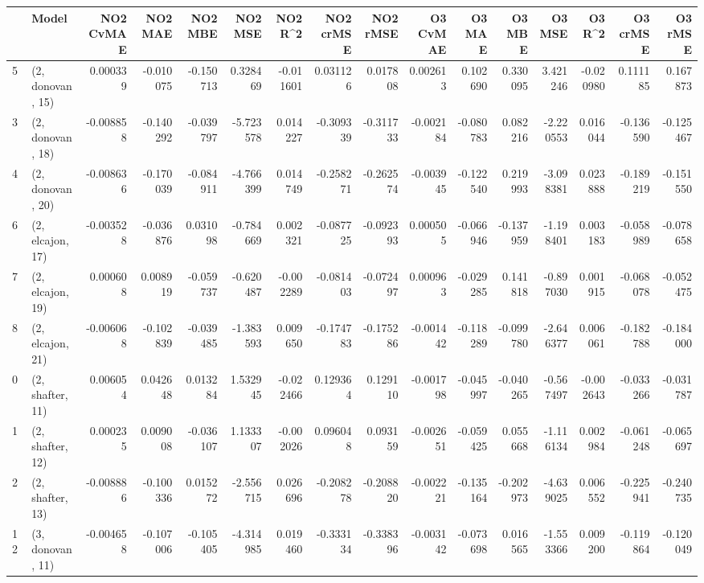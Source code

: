 \begin{tabular}{llrrrrrrrrrrrrrr}
\toprule
{} &             Model &  NO2 CvMAE &   NO2 MAE &   NO2 MBE &    NO2 MSE &   NO2 R\textasciicircum2 &  NO2 crMSE &  NO2 rMSE &  O3 CvMAE &    O3 MAE &    O3 MBE &     O3 MSE &    O3 R\textasciicircum2 &  O3 crMSE &   O3 rMSE \\
\midrule
5  &  (2, donovan, 15) &   0.000339 & -0.010075 & -0.150713 &   0.328469 & -0.011601 &   0.031126 &  0.017808 &  0.002613 &  0.102690 &  0.330095 &   3.421246 & -0.020980 &  0.111185 &  0.167873 \\
3  &  (2, donovan, 18) &  -0.008858 & -0.140292 & -0.039797 &  -5.723578 &  0.014227 &  -0.309339 & -0.311733 & -0.002184 & -0.080783 &  0.082216 &  -2.220553 &  0.016044 & -0.136590 & -0.125467 \\
4  &  (2, donovan, 20) &  -0.008636 & -0.170039 & -0.084911 &  -4.766399 &  0.014749 &  -0.258271 & -0.262574 & -0.003945 & -0.122540 &  0.219993 &  -3.098381 &  0.023888 & -0.189219 & -0.151550 \\
6  &  (2, elcajon, 17) &  -0.003528 & -0.036876 &  0.031098 &  -0.784669 &  0.002321 &  -0.087725 & -0.092393 &  0.000505 & -0.066946 & -0.137959 &  -1.198401 &  0.003183 & -0.058989 & -0.078658 \\
7  &  (2, elcajon, 19) &   0.000608 &  0.008919 & -0.059737 &  -0.620487 & -0.002289 &  -0.081403 & -0.072497 &  0.000963 & -0.029285 &  0.141818 &  -0.897030 &  0.001915 & -0.068078 & -0.052475 \\
8  &  (2, elcajon, 21) &  -0.006068 & -0.102839 & -0.039485 &  -1.383593 &  0.009650 &  -0.174783 & -0.175286 & -0.001442 & -0.118289 & -0.099780 &  -2.646377 &  0.006061 & -0.182788 & -0.184000 \\
0  &  (2, shafter, 11) &   0.006054 &  0.042648 &  0.013284 &   1.532945 & -0.022466 &   0.129364 &  0.129110 & -0.001798 & -0.045997 & -0.040265 &  -0.567497 & -0.002643 & -0.033266 & -0.031787 \\
1  &  (2, shafter, 12) &   0.000235 &  0.009008 & -0.036107 &   1.133307 & -0.002026 &   0.096048 &  0.093159 & -0.002651 & -0.059425 &  0.055668 &  -1.116134 &  0.002984 & -0.061248 & -0.065697 \\
2  &  (2, shafter, 13) &  -0.008886 & -0.100336 &  0.015272 &  -2.556715 &  0.026696 &  -0.208278 & -0.208820 & -0.002221 & -0.135164 & -0.202973 &  -4.639025 &  0.006552 & -0.225941 & -0.240735 \\
12 &  (3, donovan, 11) &  -0.004658 & -0.107006 & -0.105405 &  -4.314985 &  0.019460 &  -0.333134 & -0.338396 & -0.003142 & -0.073698 &  0.016565 &  -1.553366 &  0.009200 & -0.119864 & -0.120049 \\

\end{tabular}
